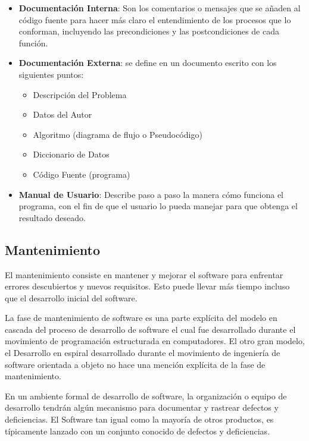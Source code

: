 \documentclass[12pt]{article}
\begin{document}
	\begin{itemize}[label=\textbullet, leftmargin=1.27cm]
		\item \textbf{Documentación Interna}: Son los comentarios o mensajes que se añaden al código fuente para hacer más claro el entendimiento de los procesos que lo conforman, incluyendo las precondiciones y las postcondiciones de cada función.
		\item \textbf{Documentación Externa}: se define en un documento escrito con los siguientes puntos:
			\begin{itemize}[label=○]
				\item Descripción del Problema
				\item Datos del Autor
				\item Algoritmo (diagrama de flujo o Pseudocódigo)
				\item Diccionario de Datos
				\item Código Fuente (programa)
			\end{itemize}
		\item \textbf{Manual de Usuario}: Describe paso a paso la manera cómo funciona el programa, con el fin de que el usuario lo pueda manejar para que obtenga el resultado deseado.
	\end{itemize}

	\subsection*{Mantenimiento}

	\hspace{1.27cm}El mantenimiento consiste en mantener y mejorar el software para enfrentar errores descubiertos y nuevos requisitos. Esto puede llevar más tiempo incluso que el desarrollo inicial del software.

	\hspace{1.27cm}La fase de mantenimiento de software es una parte explícita del modelo en cascada del proceso de desarrollo de software el cual fue desarrollado durante el movimiento de programación estructurada en computadores. El otro gran modelo, el Desarrollo en espiral desarrollado durante el movimiento de ingeniería de software orientada a objeto no hace una mención explícita de la fase de mantenimiento.

	\hspace{1.27cm}En un ambiente formal de desarrollo de software, la organización o equipo de desarrollo tendrán algún mecanismo para documentar y rastrear defectos y deficiencias. El Software tan igual como la mayoría de otros productos, es típicamente lanzado con un conjunto conocido de defectos y deficiencias.
\end{document}

